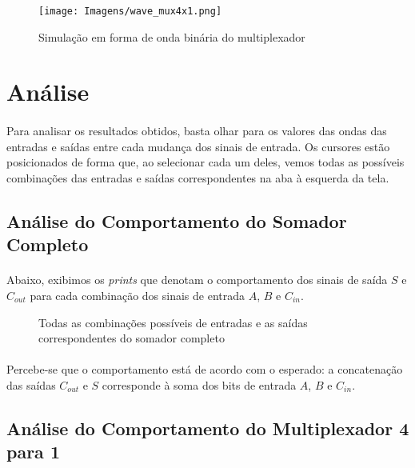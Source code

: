\documentclass[a4paper,12pt]{article}
\begin{document}
\begin{figure}[H]
    \centering
    \begin{tcolorbox}[colframe=cinza, colback=white, boxrule=1pt, arc=0pt, width=1\textwidth, center, boxsep=0pt, left=0pt, right=0pt, top=0pt, bottom=0pt]
    \texttt{[image: Imagens/wave\_mux4x1.png]}
    \end{tcolorbox}
    \caption{Simulação em forma de onda binária do multiplexador}
\end{figure}

\section{Análise}

\paragraph{}
Para analisar os resultados obtidos, basta olhar para os valores das ondas das entradas e saídas entre cada mudança dos sinais de entrada. Os cursores estão posicionados de forma que, ao selecionar cada um deles, vemos todas as possíveis combinações das entradas e saídas correspondentes na aba à esquerda da tela.

\subsection{Análise do Comportamento do Somador Completo}
\paragraph{}
 Abaixo, exibimos os \textit{prints} que denotam o comportamento dos sinais de saída $S$ e $C_{out}$ para cada combinação dos sinais de entrada $A$, $B$ e $C_{in}$.

\begin{figure}[H]
    \centering
    
    \caption{Todas as combinações possíveis de entradas e as saídas correspondentes do somador completo}
\end{figure}

\paragraph{}
Percebe-se que o comportamento está de acordo com o esperado: a concatenação das saídas $C_{out}$ e $S$ corresponde à soma dos bits de entrada $A$, $B$ e $C_{in}$.

\subsection{Análise do Comportamento do Multiplexador 4 para 1}
\end{document}
